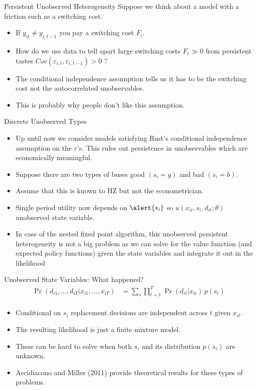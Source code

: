 \begin{frame}{Persistent Unobserved Heterogeneity}
Suppose we think about a model with a friction such as a switching cost.
\begin{itemize}
\item If $y_{it} \neq y_{i,t-1}$ you pay a switching cost $F_i$.
\item How do we use data to tell apart large switching costs $F_i  \gg0$ from persistent tastes $Cov(\varepsilon_{i,t},\varepsilon_{i,t-1}) > 0$ ?
\item The \alert{conditional independence assumption} tells us it has to be the switching cost not the autocorrelated unobservables.
\item This is probably why people don't like this assumption.
\end{itemize}
\end{frame}


\begin{frame}{Discrete Unobserved Types}
\begin{itemize}
\item Up until now we consider models satisfying Rust's \alert{conditional independence} assumption on the $\varepsilon$'s. This rules out persistence in unobservables which are economically meaningful.
\item Suppose there are two types of buses good $(s_i=g)$ and bad $(s_i=b)$.
\item Assume that this is known to HZ but not the econometrician.
\item Single period utility now depends on $\alert{s_i}$ so $u(x_{it},s_i,d_{it}; \theta)$ \alert{unobserved state variable}.
\item In case of the nested fixed point algorithm, this unobserved persistent heterogeneity is not a big problem as we can solve for the value function (and expected policy functions) given the state variables and \alert{integrate it out} in the likelihood
\end{itemize}
\end{frame}



\begin{frame}{Unobserved State Variables: What happened?}
\begin{align*}
\Pr(d_{i1},\ldots,d_{iT} | x_{i1},\ldots,x_{iT} ) &= \sum_{s}  \prod_{t=1}^T \Pr(d_{it} | x_{it} ) \, p(s_i) \\
\end{align*}
\begin{itemize}
\item \alert{Conditional on $s_i$ replacement decisions are independent across $t$ given $x_{it}$}.
\item The resulting likelihood is just a \alert{finite mixture model}.
\item These can be hard to solve when both $s_i$ and its distribution $p(s_i)$ are unknown.
\item Arcidiacono and Miller (2011) provide theoretical results for these types of problems.
\end{itemize}
\end{frame}


